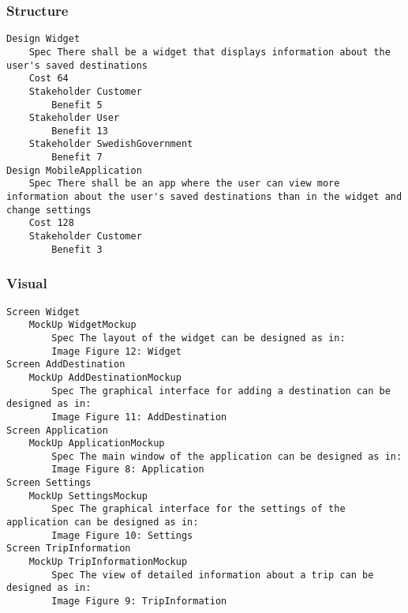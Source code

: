 \begin{lstlisting}

\end{lstlisting}


			 \subsubsection{Structure}


\begin{lstlisting}
Design Widget
	Spec There shall be a widget that displays information about the user's saved destinations
	Cost 64
	Stakeholder Customer
		Benefit 5
	Stakeholder User
		Benefit 13
	Stakeholder SwedishGovernment
		Benefit 7
Design MobileApplication
	Spec There shall be an app where the user can view more information about the user's saved destinations than in the widget and change settings
	Cost 128
	Stakeholder Customer
		Benefit 3

\end{lstlisting}
		
				
			 \subsubsection{Visual}


\begin{lstlisting}
Screen Widget
	MockUp WidgetMockup
		Spec The layout of the widget can be designed as in:
		Image Figure 12: Widget
Screen AddDestination
	MockUp AddDestinationMockup
		Spec The graphical interface for adding a destination can be designed as in:
		Image Figure 11: AddDestination
Screen Application
	MockUp ApplicationMockup
		Spec The main window of the application can be designed as in:
		Image Figure 8: Application
Screen Settings
	MockUp SettingsMockup
		Spec The graphical interface for the settings of the application can be designed as in:
		Image Figure 10: Settings
Screen TripInformation
	MockUp TripInformationMockup
		Spec The view of detailed information about a trip can be designed as in:
		Image Figure 9: TripInformation

\end{lstlisting}